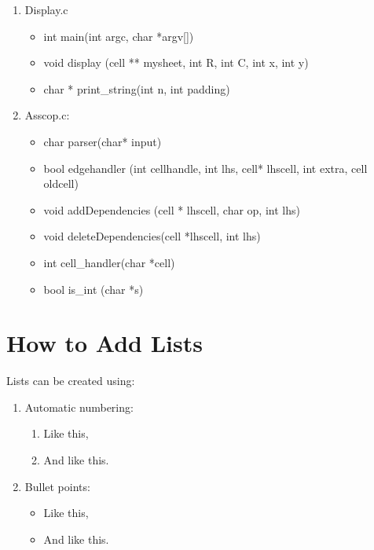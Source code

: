 \documentclass[a4paper]{article}
\begin{document}
\begin{enumerate}
    \item Display.c
    \begin{itemize}
        \item int main(int argc, char *argv[])
        \item void display (cell ** mysheet, int R, int C, int x, int y)
        \item char * print\_string(int n, int padding)
    \end{itemize}
    \item Asscop.c:
    \begin{itemize}
        \item char parser(char* input)
        \item bool edgehandler (int cellhandle, int lhs, cell* lhscell, int extra, cell oldcell)
        \item void addDependencies (cell * lhscell, char op, int lhs)
        \item void deleteDependencies(cell *lhscell, int lhs)
        \item int cell\_handler(char *cell)
        \item bool is\_int (char *s)
    \end{itemize}
\end{enumerate}


\section{How to Add Lists}
Lists can be created using:
\begin{enumerate}
    \item Automatic numbering:
    \begin{enumerate}
        \item Like this,
        \item And like this.
    \end{enumerate}
    \item Bullet points:
    \begin{itemize}
        \item Like this,
        \item And like this.
    \end{itemize}
\end{enumerate}
\end{document}
